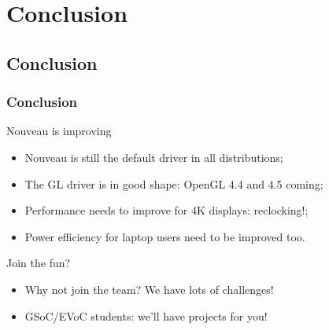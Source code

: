 \documentclass[11pt,english,compress]{beamer}
\begin{document}
\section{Conclusion}

\subsection*{Conclusion}
\begin{frame}
	\frametitle{Conclusion}

	\begin{block}{Nouveau is improving}
		\begin{itemize}
			\item Nouveau is still the default driver in all distributions;
			\item The GL driver is in good shape: OpenGL 4.4 and 4.5 coming;
			\item Performance needs to improve for 4K displays: reclocking!;
			\item Power efficiency for laptop users need to be improved too.
		\end{itemize}
	\end{block}

	\begin{block}{Join the fun?}
		\begin{itemize}
			\item Why not join the team? We have lots of challenges!
			\item GSoC/EVoC students: we'll have projects for you!
		\end{itemize}
	\end{block}
\end{frame}
\end{document}

